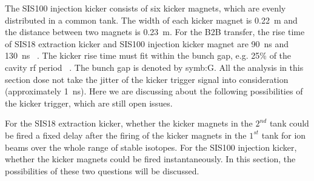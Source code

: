 The SIS100 injection kicker consists of six kicker magnets, which are evenly distributed in a common tank. The width of each kicker magnet is \SI{0.22}{m} and the distance between two magnets is \SI{0.23}{m}. For the B2B transfer, the rise time of SIS18 extraction kicker and SIS100 injection kicker magnet are \SI{90}{ns} and \SI{130}{ns} ~\cite{blell_detailed_2014}. The kicker rise time must fit within the bunch gap, e.g. 25$\%$ of the cavity rf period ~\cite{blell_injection_2014, liebermann_sis100_2013}. The bunch gap is denoted by \gls{symb:G}.  All the analysis in this section dose not take the jitter of the kicker trigger signal into consideration (approximately \SI{1}{ns}). Here we are discussing about the following possibilities of the kicker trigger, which are still open issues. 

For the SIS18 extraction kicker, whether the kicker magnets in the $2^{nd}$ tank could be fired a fixed delay after the firing of the kicker magnets in the $1^{st}$ tank for ion beams over the whole range of stable isotopes. For the SIS100 injection kicker, whether the kicker magnets could be fired instantaneously. In this section, the possibilities of these two questions will be discussed. 


